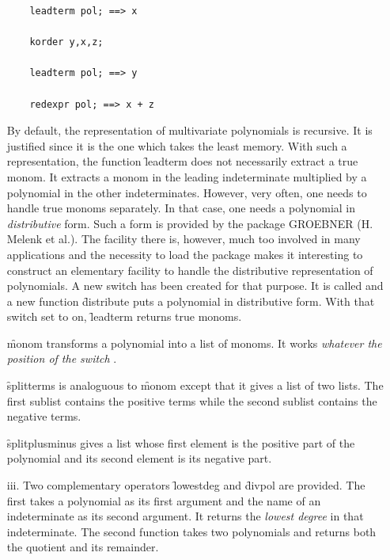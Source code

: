 \begin{itemize}
\begin{verbatim}
    leadterm pol; ==> x

    korder y,x,z;

    leadterm pol; ==> y

    redexpr pol; ==> x + z
\end{verbatim}
By default, the representation of multivariate polynomials is recursive.
It is justified since it is the one which takes the least memory.
With such a representation, the function \f{leadterm} does not necessarily
extract a true monom. It extracts a monom in the leading indeterminate
multiplied by a polynomial in the other indeterminates. However, very often,
 one needs to handle true monoms separately. In that case, one needs a
polynomial in \emph{distributive} form. Such a form is provided by the
package \textsc{GROEBNER} (H. Melenk et al.). The facility there is, however,
much too involved in many applications and the necessity to load the package
makes it interesting
to construct an elementary facility to handle the distributive representation
of polynomials. A new switch has been created for that purpose.
It is called  and a new function \f{distribute} puts a
polynomial in distributive form. With that switch set to on,
\f{leadterm} returns true monoms.

\hypertarget{operator:MONOM}{}
\f{monom} transforms a polynomial into a list of monoms. It works
\emph{whatever the position of the switch} .

\hypertarget{operator:SPLITTERMS}{}
\f{splitterms} is analoguous to \f{monom} except that it gives
a list of two lists. The first sublist contains the positive terms
while the second sublist contains the negative terms.

\hypertarget{operator:SPLITPLUSMINUS}{}
\f{splitplusminus}  gives a list whose first element is the positive
part of the polynomial and its second element is its negative part.
\item[iii.]
\hypertarget{operator:LOWESTDEG}{}
\hypertarget{operator:DIVPOL}{}
Two complementary operators \f{lowestdeg} and \f{divpol} are provided.
The first takes a polynomial as its first argument and the name of an
indeterminate as its second argument. It returns the \emph{lowest degree}
in that indeterminate. The second function takes two polynomials and
returns both the quotient and its remainder.
\end{itemize}
